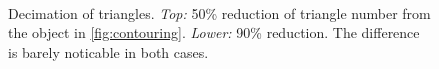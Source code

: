 \begin{figure}
\centering
   \\
   \caption{Decimation of triangles. \emph{Top:} 50\% reduction of triangle number from the object in \autoref{fig:contouring}. \emph{Lower:} 90\% reduction. The difference is barely noticable in both cases.}
   \label{fig:Decimation}
\end{figure}
